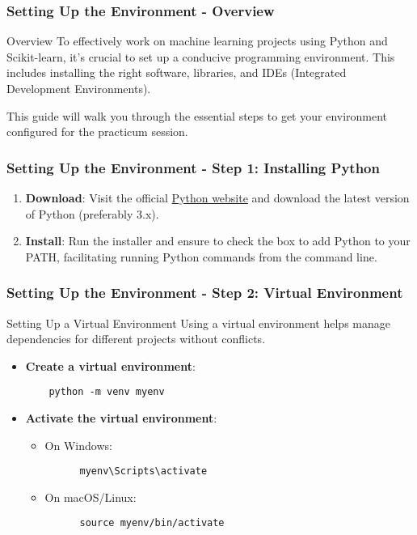 \documentclass[aspectratio=169]{beamer}
\begin{document}
\begin{frame}[fragile]
  \frametitle{Setting Up the Environment - Overview}
  \begin{block}{Overview}
  To effectively work on machine learning projects using Python and Scikit-learn, it's crucial to set up a conducive programming environment. This includes installing the right software, libraries, and IDEs (Integrated Development Environments).
  \end{block}
  This guide will walk you through the essential steps to get your environment configured for the practicum session.
\end{frame}

\begin{frame}[fragile]
  \frametitle{Setting Up the Environment - Step 1: Installing Python}
  \begin{enumerate}
    \item \textbf{Download}: Visit the official \href{https://www.python.org/downloads/}{Python website} and download the latest version of Python (preferably 3.x).
    \item \textbf{Install}: Run the installer and ensure to check the box to add Python to your PATH, facilitating running Python commands from the command line.
  \end{enumerate}
\end{frame}

\begin{frame}[fragile]
  \frametitle{Setting Up the Environment - Step 2: Virtual Environment}
  \begin{block}{Setting Up a Virtual Environment}
  Using a virtual environment helps manage dependencies for different projects without conflicts.
  \end{block}
  
  \begin{itemize}
    \item \textbf{Create a virtual environment}:
    \begin{lstlisting}
    python -m venv myenv
    \end{lstlisting}
  
    \item \textbf{Activate the virtual environment}:
    \begin{itemize}
      \item On Windows:
      \begin{lstlisting}
      myenv\Scripts\activate
      \end{lstlisting}
      \item On macOS/Linux:
      \begin{lstlisting}
      source myenv/bin/activate
      \end{lstlisting}
    \end{itemize}
  \end{itemize}
\end{frame}
\end{document}
